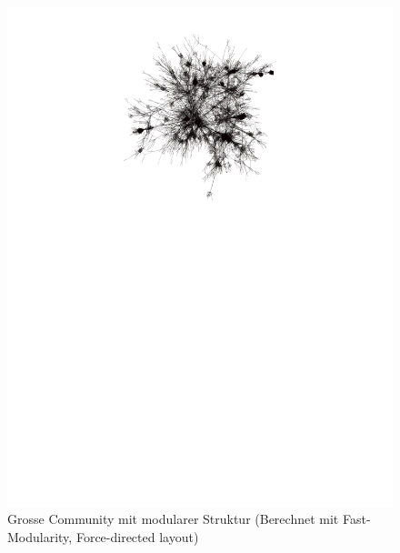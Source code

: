 \begin{figure}[h]
  \centering
  \includegraphics[scale=1.7]{images/fastmod-subgraph-large-modular-6525064ccab580a0b304a3620b197d7a.pdf}
  \caption{Grosse Community mit modularer Struktur (Berechnet mit
    Fast-Modularity, Force-directed layout)}
  \label{fig:large-community-modular}
\end{figure}
